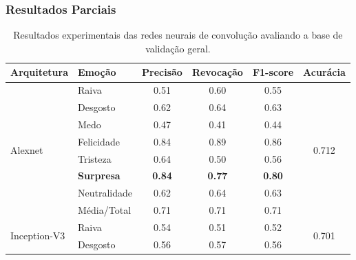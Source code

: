 \documentclass{beamer}
\begin{document}
\begin{frame}
 \frametitle{Resultados Parciais}
\begin{table}[]
\tiny
\centering
\caption{Resultados experimentais das redes neurais de convolução avaliando a base de validação geral.}
\label{table:resultsexp}
\begin{tabular}{llcccc}
\hline
\textbf{Arquitetura}                & \textbf{Emoção}       & \textbf{Precisão} & \textbf{Revocação} & \textbf{F1-score} & \textbf{Acurácia}               \\ \hline
\multirow{8}{*}{Alexnet}            & Raiva                 & 0.51              & 0.60               & 0.55              & \multirow{8}{*}{0.712}          \\
                                    & Desgosto              & 0.62              & 0.64               & 0.63              &                                 \\
                                    & Medo                  & 0.47              & 0.41               & 0.44              &                                 \\
                                    & Felicidade            & 0.84              & 0.89               & 0.86              &                                 \\
                                    & Tristeza              & 0.64              & 0.50               & 0.56              &                                 \\
                                    & \scriptsize \textbf{Surpresa}              & \scriptsize \textbf{0.84}              & \scriptsize \textbf{0.77}               & \scriptsize \textbf{0.80}              &                                 \\
                                    & Neutralidade          & 0.62              & 0.64               & 0.63              &                                 \\
                                    & Média/Total           & 0.71              & 0.71               & 0.71              &                                 \\ \hline
\multirow{8}{*}{Inception-V3}       & Raiva                 & 0.54              & 0.51               & 0.52              & \multirow{8}{*}{0.701}          \\
                                    & Desgosto              & 0.56              & 0.57               & 0.56              &                                 \\

\end{tabular}
\end{table}
\end{frame}
\end{document}
